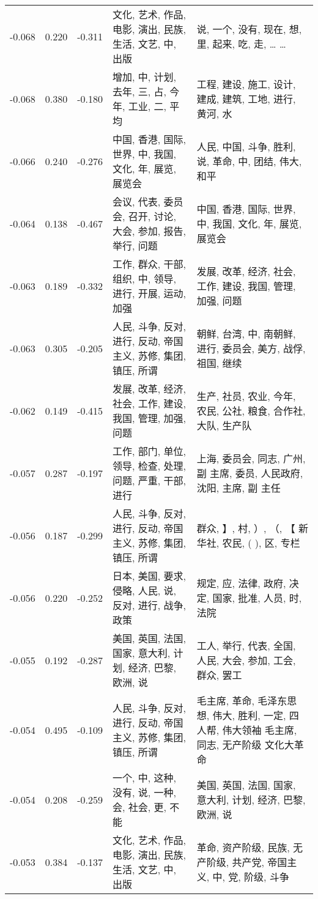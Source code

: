 \begin{tabular}{cccp{5cm}p{5cm}}
-0.068 & 0.220 & -0.311 & 文化, 艺术, 作品, 电影, 演出, 民族, 生活, 文艺, 中, 出版 & 说, 一个, 没有, 现在, 想, 里, 起来, 吃, 走, … … \\
-0.068 & 0.380 & -0.180 & 增加, 中, 计划, 去年, 三, 占, 今年, 工业, 二, 平均 & 工程, 建设, 施工, 设计, 建成, 建筑, 工地, 进行, 黄河, 水 \\
-0.066 & 0.240 & -0.276 & 中国, 香港, 国际, 世界, 中, 我国, 文化, 年, 展览, 展览会 & 人民, 中国, 斗争, 胜利, 说, 革命, 中, 团结, 伟大, 和平 \\
-0.064 & 0.138 & -0.467 & 会议, 代表, 委员会, 召开, 讨论, 大会, 参加, 报告, 举行, 问题 & 中国, 香港, 国际, 世界, 中, 我国, 文化, 年, 展览, 展览会 \\
-0.063 & 0.189 & -0.332 & 工作, 群众, 干部, 组织, 中, 领导, 进行, 开展, 运动, 加强 & 发展, 改革, 经济, 社会, 工作, 建设, 我国, 管理, 加强, 问题 \\
-0.063 & 0.305 & -0.205 & 人民, 斗争, 反对, 进行, 反动, 帝国主义, 苏修, 集团, 镇压, 所谓 & 朝鲜, 台湾, 中, 南朝鲜, 进行, 委员会, 美方, 战俘, 祖国, 继续 \\
-0.062 & 0.149 & -0.415 & 发展, 改革, 经济, 社会, 工作, 建设, 我国, 管理, 加强, 问题 & 生产, 社员, 农业, 今年, 农民, 公社, 粮食, 合作社, 大队, 生产队 \\
-0.057 & 0.287 & -0.197 & 工作, 部门, 单位, 领导, 检查, 处理, 问题, 严重, 干部, 进行 & 上海, 委员会, 同志, 广州, 副 主席, 委员, 人民政府, 沈阳, 主席, 副 主任 \\
-0.056 & 0.187 & -0.299 & 人民, 斗争, 反对, 进行, 反动, 帝国主义, 苏修, 集团, 镇压, 所谓 & 群众, 】, 村, ）, （, 【 新华社, 农民, ( ), 区, 专栏 \\
-0.056 & 0.220 & -0.252 & 日本, 美国, 要求, 侵略, 人民, 说, 反对, 进行, 战争, 政策 & 规定, 应, 法律, 政府, 决定, 国家, 批准, 人员, 时, 法院 \\
-0.055 & 0.192 & -0.287 & 美国, 英国, 法国, 国家, 意大利, 计划, 经济, 巴黎, 欧洲, 说 & 工人, 举行, 代表, 全国, 人民, 大会, 参加, 工会, 群众, 罢工 \\
-0.054 & 0.495 & -0.109 & 人民, 斗争, 反对, 进行, 反动, 帝国主义, 苏修, 集团, 镇压, 所谓 & 毛主席, 革命, 毛泽东思想, 伟大, 胜利, 一定, 四人帮, 伟大领袖 毛主席, 同志, 无产阶级 文化大革命 \\
-0.054 & 0.208 & -0.259 & 一个, 中, 这种, 没有, 说, 一种, 会, 社会, 更, 不能 & 美国, 英国, 法国, 国家, 意大利, 计划, 经济, 巴黎, 欧洲, 说 \\
-0.053 & 0.384 & -0.137 & 文化, 艺术, 作品, 电影, 演出, 民族, 生活, 文艺, 中, 出版 & 革命, 资产阶级, 民族, 无产阶级, 共产党, 帝国主义, 中, 党, 阶级, 斗争 \\

\end{tabular}

